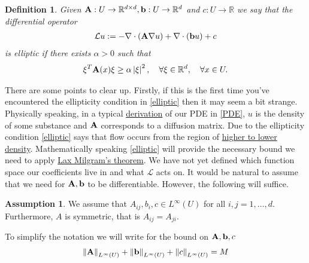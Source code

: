 \documentclass[
    a4paper,
    DIV=14,
    abstract=true,
    numbers=noenddot
]
{scrartcl}
\newtheorem{definition}[theorem]{Definition}
\theoremstyle{definition}
\newtheorem{assumption}{Assumption}
\renewcommand{\norm}[1]{\left\lVert #1 \right\rVert}\renewcommand{\abs}[1]{\left| #1 \right|}
\newcommand{\R}{\mathbb{R}}
\newcommand{\Ll}{\mathcal{L}}
\begin{document}
\begin{definition}
    Given $\vb{A}: U \to \R^{d \times d}, \vb{b}: U \to \R^d$ and $c:U \to \R$ we say that the differential operator
    \begin{align}\label{operator}
        \Ll u:= -\nabla \cdot (\vb{A} \nabla u)+ \nabla \cdot (\vb{b} u)+c\end{align}
    is \emph{elliptic} if there exists $\alpha>0$ such that
    \begin{align}\label{elliptic}
        \xi ^T\vb{A}(x) \xi  \geq \alpha \abs{\xi }^2 , \quad\forall \xi \in \R^d , \quad\forall x \in U .
    \end{align}
\end{definition}
There are some points to clear up. Firstly, if this is the first time you've encountered  the ellipticity condition in \eqref{elliptic} then it may seem a bit strange.  Physically speaking, in a typical \href{https://nowheredifferentiable.com/2023-12-23-PDEs-4-Physical_derivation_of_parabolic_and_elliptic_PDE/}{derivation} of our PDE in \eqref{PDE}, $u$ is the density of some substance and $\vb{A}$ corresponds to a diffusion matrix. Due to the ellipticity condition \eqref{elliptic} says that flow occurs from the region of \href{https://nowheredifferentiable.com/2023-12-23-PDEs-4-Physical_derivation_of_parabolic_and_elliptic_PDE/#:~:text=a)-,Diffusion,-%3A%20This%20is%20the}{higher to lower density}. Mathematically speaking \eqref{elliptic} will provide the necessary bound we need to apply \href{https://nowheredifferentiable.com/2023-05-30-PDE-2-Hilbert/#:~:text=degenerate.%20As%20a-,particular,-example%2C%20a%20symmetric}{Lax Milgram's theorem}. We have not yet defined which function space our coefficients live in and what $\Ll$ acts on. It would be natural to assume that we need for $\vb{A},\vb{b}$ to be differentiable. However, the following will suffice.
\begin{assumption}\label{Ass1}
    We assume that  $A_{ij}, b_i, c \in L^\infty (U)$ for all $i,j=1,\ldots,d$. Furthermore, $A$ is symmetric, that is  $A_{ij}=A_{ji}$.
\end{assumption}
To simplify the notation we will write for the bound on $\vb{A},\vb{b},c$
\begin{align*}
    \norm{\vb{A}}_{L^\infty(U)}+\norm{\vb{b}}_{L^\infty(U)}+\norm{c}_{L^\infty(U)}=M
\end{align*}
\end{document}
